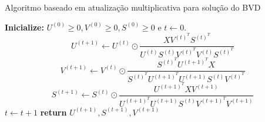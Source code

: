 \documentclass[
    12pt,                %
    oneside,            %
    a4paper,            %
    english,            %
    brazil                %
    ]{abntex2ppgsi}
\newtheorem{theorem}{Teorema}
\begin{document}
\begin{algorithm}
\caption{Algoritmo baseado em atualização multiplicativa para solução do BVD}
\label{algo:bvd}
    \begin{algorithmic}[1]
            \State \textbf{Inicialize:} $U^{(0)} \geq 0, V^{(0)} \geq 0, S^{(0)} \geq 0$ e $t \gets 0$.
                \State
                    \begin{equation}
                    \label{eq:bvd:updateU}
                        U^{(t+1)} \gets U^{(t)} \odot \frac{ X V^{(t)^T} S^{(t)^T} }{ U^{(t)} S^{(t)} V^{(t)^T} V^{(t)} S^{(t)^T} }
                    \end{equation}
                \State
                    \begin{equation}
                    \label{eq:bvd:updateV}
                        V^{(t+1)} \gets V^{(t)} \odot \frac{ S^{(t)^T} U^{(t+1)^T} X }{ S^{(t)^T} U^{(t+1)^T} U^{(t+1)} S^{(t)} V^{(t)^T} }
                    \end{equation}
                \State
                    \begin{equation}
                    \label{eq:bvd:updateS}
                        S^{(t+1)} \gets S^{(t)} \odot \frac{ U^{(t+1)^T} X V^{(t+1)} }{ U^{(t+1)^T} U^{(t+1)} S^{(t)} V^{(t+1)^T} V^{(t+1)} }
                    \end{equation}
                \State $t \gets t + 1$
            \EndWhile\label{euclidendwhile}
            \State \textbf{return} $U^{(t+1)}, S^{(t+1)}, V^{(t+1)}$
        \EndFunction
    \end{algorithmic}
\end{algorithm}


\end{document}
